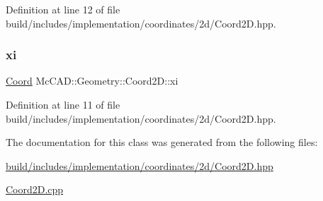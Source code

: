 Definition at line 12 of file build/includes/implementation/coordinates/2d/\+Coord2\+D.\+hpp.

\mbox{\label{classMcCAD_1_1Geometry_1_1Coord2D_a5b99b9ce570b6bd792bd485fb2f305bb}} 
\subsubsection{\texorpdfstring{xi}{xi}}
{\footnotesize\ttfamily \hyperlink{classMcCAD_1_1Geometry_1_1Coord}{Coord} Mc\+C\+A\+D\+::\+Geometry\+::\+Coord2\+D\+::xi}



Definition at line 11 of file build/includes/implementation/coordinates/2d/\+Coord2\+D.\+hpp.



The documentation for this class was generated from the following files\+:\begin{DoxyCompactItemize}
\item 
\hyperlink{build_2includes_2implementation_2coordinates_22d_2Coord2D_8hpp}{build/includes/implementation/coordinates/2d/\+Coord2\+D.\+hpp}\item 
\hyperlink{Coord2D_8cpp}{Coord2\+D.\+cpp}\end{DoxyCompactItemize}
